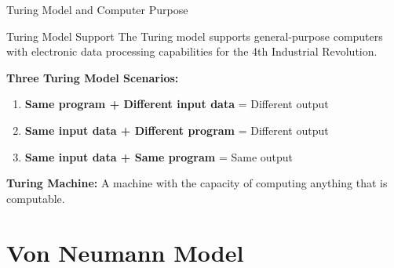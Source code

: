 \documentclass[aspectratio=169]{beamer}
\begin{document}
\begin{frame}{Turing Model and Computer Purpose}
    \begin{block}{Turing Model Support}
        The Turing model supports general-purpose computers with electronic data processing capabilities for the 4th Industrial Revolution.
    \end{block}
    
    \textbf{Three Turing Model Scenarios:}
    \begin{enumerate}
        \item \textbf{Same program + Different input data} = Different output
        \item \textbf{Same input data + Different program} = Different output  
        \item \textbf{Same input data + Same program} = Same output
    \end{enumerate}
    
    \begin{center}
    \end{center}
    
    \begin{definition}
        \textbf{Turing Machine:} A machine with the capacity of computing anything that is computable.
    \end{definition}
\end{frame}

\section{Von Neumann Model}
\end{document}
